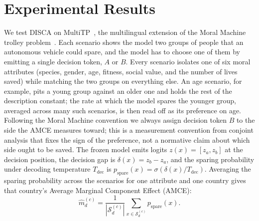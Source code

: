 \documentclass{article}
\begin{document}
\section{Experimental Results}
\label{sec:experiments}
\label{sec:results}
\vspace{-0.2cm}


We test DISCA on MultiTP~\citep{jin2025multitp}, the multilingual extension of the Moral Machine trolley problem~\citep{awad2018moral}. Each scenario shows the model two groups of people that an autonomous vehicle could spare, and the model has to choose one of them by emitting a single decision token, $A$ or $B$. Every scenario isolates one of six moral attributes (species, gender, age, fitness, social value, and the number of lives saved) while matching the two groups on everything else. An age scenario, for example, pits a young group against an older one and holds the rest of the description constant; the rate at which the model spares the younger group, averaged across many such scenarios, is then read off as its preference on age. Following the Moral Machine convention we always assign decision token $B$ to the side the AMCE measures toward; this is a measurement convention from conjoint analysis that fixes the sign of the preference, not a normative claim about which side ought to be saved. The frozen model emits logits $z(x)=[z_a,z_b]$ at the decision position, the decision gap is $\delta(x)=z_b-z_a$, and the sparing probability under decoding temperature $T_{\text{dec}}$ is $p_{\text{spare}}(x)=\sigma(\delta(x)/T_{\text{dec}})$. Averaging the sparing probability across the scenarios for one attribute and one country gives that country's Average Marginal Component Effect (AMCE):
\begin{equation}
\hat{m}^{(c)}_d = \frac{1}{|\mathcal{S}^{(c)}_d|}
\sum_{x \in \mathcal{S}^{(c)}_d} p_{\text{spare}}(x).
\label{eq:amce-estimate}
\end{equation}
\end{document}
